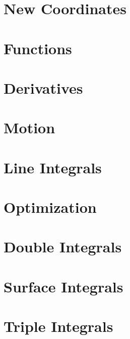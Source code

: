 \documentclass[letterpaper,oneside]{book}%
\newcommand{\wrapup}{
\bmw{\section{Wrap Up}
Once you have finished the problems in the section and feel comfortable with the ideas, create a short one page lesson plan that contains examples of the key ideas.  You will get a chance to teach from this lesson plan prior to taking the exam. Then log on to Brainhoney and download the quiz. Once you have taken the quiz, you can upload your work back to brainhoney and then download the key to see how you did. If you still need to work on mastering some of the ideas, please do so and then demonstrate your mastery though the quiz corrections.}
}
\newcommand{\bmw}[1]{}
\theoremstyle{plain}
\theoremstyle{box}
\theoremstyle{problem}
\begin{document}
\chapter{New Coordinates}

\wrapup

\chapter{Functions}

\wrapup

\chapter{Derivatives}

\wrapup

\chapter{Motion}

\wrapup


\chapter{Line Integrals}
\chapter{Optimization}

\chapter{Double Integrals}
\chapter{Surface Integrals}
\chapter{Triple Integrals}
\end{document}
